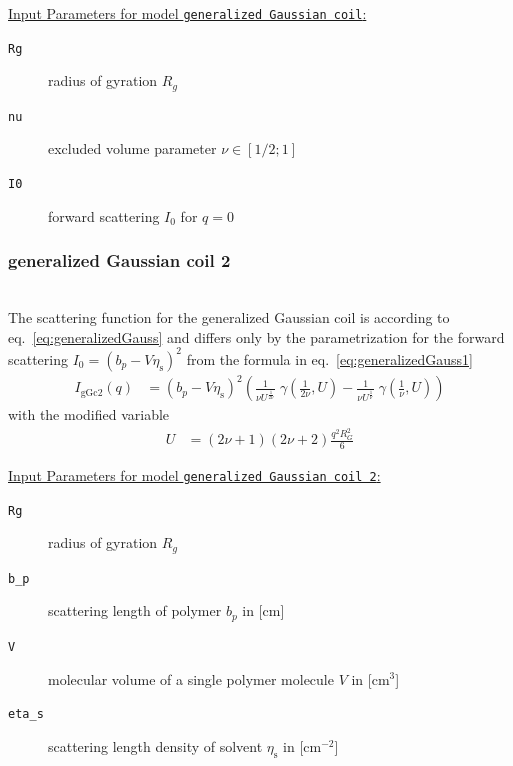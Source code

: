 \vspace{5mm}
\underline{Input Parameters for model \texttt{generalized Gaussian coil}:}
\begin{description}
\item[\texttt{Rg}] radius of gyration $R_g$
\item[\texttt{nu}] excluded volume parameter $\nu\in [1/2;1]$
\item[\texttt{I0}] forward scattering $I_0$ for $q=0$
\end{description}
\vspace{5mm}


\subsubsection{generalized Gaussian coil 2} \cite{Hammouda,Hammouda2012}
\label{sect:generalized_gaussian_coil2}
~\\
The scattering function for the generalized Gaussian coil is according to eq.\ \ref{eq:generalizedGauss}
and differs only by the parametrization for the forward scattering
$I_0=(b_p-V\eta_\text{s})^2$ from the formula in eq.\ \ref{eq:generalizedGauss1}
\begin{align}
I_\text{gGc2}(q) &= \left(b_p-V\eta_\text{s}\right)^2
\left(
\frac{1}{\nu U^{\frac{1}{2 \nu}}} \; \gamma\left(\frac{1}{2 \nu},U\right)-
\frac{1}{\nu U^{\frac{1}{  \nu}}} \; \gamma\left(\frac{1}{  \nu},U\right)
\right)
\label{eq:generalizedGauss2}
\end{align}
with the modified variable
\begin{align}
U&= \left(2\nu+1\right)\left(2\nu+2\right)\frac{q^2R_G^2}{6}
\end{align}

\vspace{5mm}
\underline{Input Parameters for model \texttt{generalized Gaussian coil 2}:}
\begin{description}
\item[\texttt{Rg}] radius of gyration $R_g$
\item[\texttt{b\_p}] scattering length of polymer $b_p$ in [cm]
\item[\texttt{V}] molecular volume of a single polymer molecule $V$ in [cm$^3$]
\item[\texttt{eta\_s}] scattering length density of solvent $\eta_\text{s}$ in [cm$^{-2}$]
\end{description}
\vspace{5mm}

